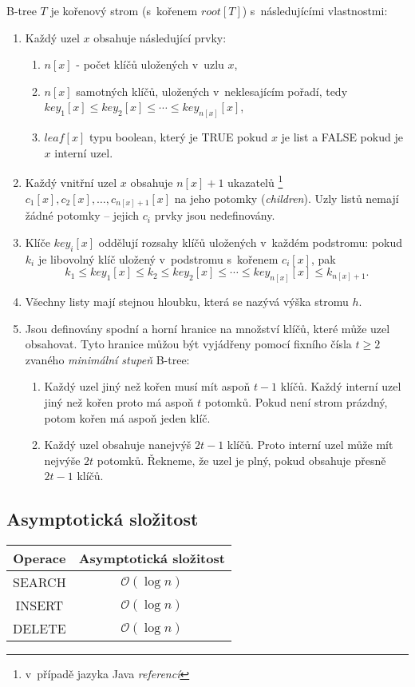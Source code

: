 B-tree $T$ je kořenový strom (s~kořenem $root[T]$) s~následujícími
vlastnostmi:
\begin{enumerate}
\item Každý uzel $x$ obsahuje následující prvky:

\begin{enumerate}
\item $n[x]$ - počet klíčů uložených v~uzlu $x$,
\item $n[x]$ samotných klíčů, uložených v~neklesajícím pořadí, tedy \linebreak $key_{1}[x]\leq key_{2}[x]\leq\cdots\leq key_{n[x]}[x]$,
\item $leaf[x]$ typu boolean, který je TRUE pokud $x$ je list a FALSE
pokud je $x$ interní uzel\@.
\end{enumerate}
\item Každý vnitřní uzel $x$ obsahuje $n[x]+1$ ukazatelů
\footnote{v~případě jazyka Java \emph{referencí}
} $c_{1}[x],c_{2}[x],\ldots{},c_{n[x]+1}[x]$ na jeho potomky (\emph{children}).
Uzly listů nemají žádné potomky -- jejich $c_{i}$ prvky jsou nedefinovány.
\item Klíče $key_{i}[x]$ oddělují rozsahy klíčů uložených v~každém podstromu:
pokud $k_{i}$ je libovolný klíč uložený v~podstromu s~kořenem $c_{i}[x]$,
pak
\[
k_{1}\leq key_{1}[x]\leq k_{2}\leq key_{2}[x]\leq\cdots\leq key_{n[x]}[x]\leq k_{n[x]+1}.
\]

\item Všechny listy mají stejnou hloubku, která se nazývá výška stromu $h$\@.
\item Jsou definovány spodní a horní hranice na množství klíčů, které může
uzel obsahovat\@. Tyto hranice můžou být vyjádřeny pomocí fixního
čísla $t\geq2$ zvaného \emph{minimální stupeň} B-tree:

\begin{enumerate}
\item Každý uzel jiný než kořen musí mít aspoň $t-1$ klíčů\@. Každý interní
uzel jiný než kořen proto má aspoň $t$ potomků\@. Pokud není strom
prázdný, potom kořen má aspoň jeden klíč\@.
\item Každý uzel obsahuje nanejvýš $2t-1$ klíčů\@. Proto interní uzel
může mít nejvýše $2t$ potomků\@. Řekneme, že uzel je plný, pokud
obsahuje přesně $2t-1$ klíčů\@.
\end{enumerate}
\end{enumerate}

\subsection{Asymptotická složitost}
\begin{center}
\begin{tabular}{|c|c|}
\hline 
Operace & Asymptotická složitost\tabularnewline
\hline 
\hline 
SEARCH & $\mathcal{O}(\log n)$\tabularnewline
\hline 
INSERT & $\mathcal{O}(\log n)$\tabularnewline
\hline 
DELETE & $\mathcal{O}(\log n)$\tabularnewline
\hline 
\end{tabular}
\end{center}

